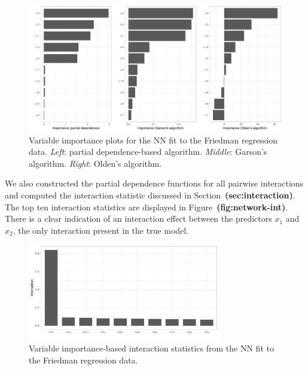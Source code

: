 \documentclass[12pt]{article}
\def\ref#1{\textbf{(#1)}}
\begin{document}
\begin{figure}[!htb]
  \centering
  \includegraphics[width=1.0\textwidth]{network-vip}
  \caption{Variable importance plots for the NN fit to the Friedman regression data. \textit{Left}: partial dependence-based algorithm. \textit{Middle}: Garson's algorithm. \textit{Right}: Olden's algorithm. \label{fig:network-vip}}
\end{figure}

We also constructed the partial dependence functions for all pairwise interactions and computed the interaction statistic discussed in Section~\ref{sec:interaction}. The top ten interaction statistics are displayed in Figure~\ref{fig:network-int}. There is a clear indication of an interaction effect between the predictors $x_1$ and $x_2$, the only interaction present in the true model.

\begin{figure}[!htb]
  \centering
  \includegraphics[width=0.75\textwidth]{network-int}
  \caption{Variable importance-based interaction statistics from the NN fit to the Friedman regression data. \label{fig:network-int}}
\end{figure}
\end{document}

